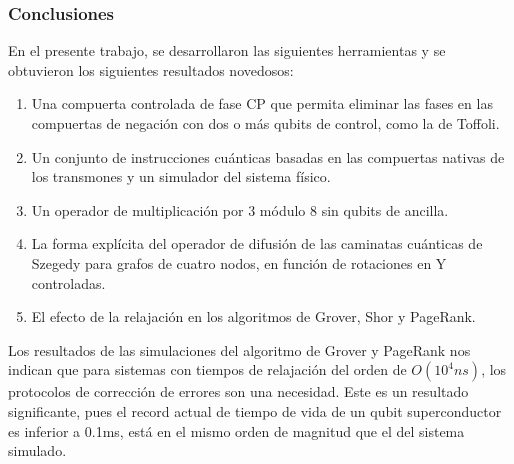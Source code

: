 \documentclass[xetex,mathserif,serif]{beamer}
\begin{document}
\begin{frame}
    \frametitle{Conclusiones}

En el presente trabajo, se desarrollaron las siguientes herramientas y se obtuvieron los siguientes resultados novedosos:

\begin{enumerate}
    \item Una compuerta controlada de fase CP que permita eliminar las fases en las compuertas de negación con dos o más qubits de control, como la de Toffoli.
    \item Un conjunto de instrucciones cuánticas basadas en las compuertas nativas de los transmones y un simulador del sistema físico.
    \item Un operador de multiplicación por 3 módulo 8 sin qubits de ancilla.
    \item La forma explícita del operador de difusión de las caminatas cuánticas de Szegedy para grafos de cuatro nodos, en función de rotaciones en Y controladas.
    \item El efecto de la relajación en los algoritmos de Grover, Shor y PageRank.
\end{enumerate}

Los resultados de las simulaciones del algoritmo de Grover y PageRank nos indican que para sistemas con tiempos de relajación del orden de $O(10^4 ns)$, los protocolos de corrección de errores son una necesidad. Este es un resultado significante, pues el record actual de tiempo de vida de un qubit superconductor es inferior a 0.1ms, está en el mismo orden de magnitud que el del sistema simulado.

\end{frame}
\end{document}
